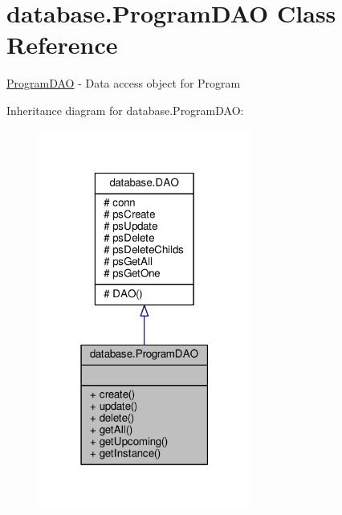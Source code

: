\hypertarget{classdatabase_1_1ProgramDAO}{\section{database.\-Program\-D\-A\-O Class Reference}
\label{classdatabase_1_1ProgramDAO}
}


\hyperlink{classdatabase_1_1ProgramDAO}{Program\-D\-A\-O} -\/ Data access object for Program  




Inheritance diagram for database.\-Program\-D\-A\-O\-:\nopagebreak
\begin{figure}[H]
\begin{center}
\leavevmode
\includegraphics[width=198pt]{classdatabase_1_1ProgramDAO__inherit__graph}
\end{center}
\end{figure}


